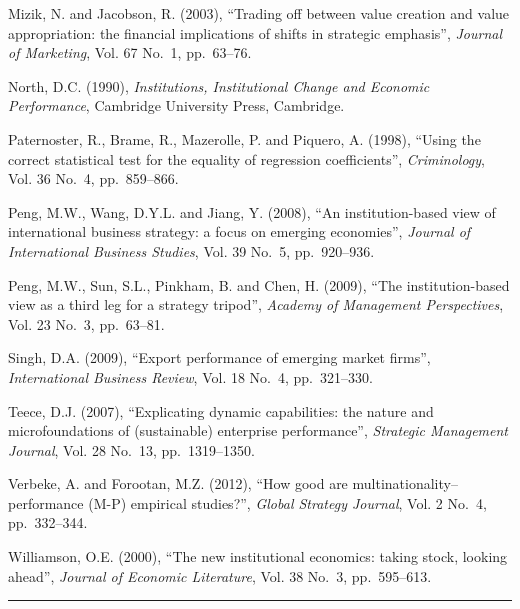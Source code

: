 \documentclass[
  12pt,a4paper]{article}
\begin{document}
Mizik, N. and Jacobson, R. (2003), ``Trading off between value creation
and value appropriation: the financial implications of shifts in
strategic emphasis'', \emph{Journal of Marketing}, Vol. 67 No.~1,
pp.~63--76.

North, D.C. (1990), \emph{Institutions, Institutional Change and
Economic Performance}, Cambridge University Press, Cambridge.

Paternoster, R., Brame, R., Mazerolle, P. and Piquero, A. (1998),
``Using the correct statistical test for the equality of regression
coefficients'', \emph{Criminology}, Vol. 36 No.~4, pp.~859--866.

Peng, M.W., Wang, D.Y.L. and Jiang, Y. (2008), ``An institution-based
view of international business strategy: a focus on emerging
economies'', \emph{Journal of International Business Studies}, Vol. 39
No.~5, pp.~920--936.

Peng, M.W., Sun, S.L., Pinkham, B. and Chen, H. (2009), ``The
institution-based view as a third leg for a strategy tripod'',
\emph{Academy of Management Perspectives}, Vol. 23 No.~3, pp.~63--81.

Singh, D.A. (2009), ``Export performance of emerging market firms'',
\emph{International Business Review}, Vol. 18 No.~4, pp.~321--330.

Teece, D.J. (2007), ``Explicating dynamic capabilities: the nature and
microfoundations of (sustainable) enterprise performance'',
\emph{Strategic Management Journal}, Vol. 28 No.~13, pp.~1319--1350.

Verbeke, A. and Forootan, M.Z. (2012), ``How good are
multinationality--performance (M-P) empirical studies?'', \emph{Global
Strategy Journal}, Vol. 2 No.~4, pp.~332--344.

Williamson, O.E. (2000), ``The new institutional economics: taking
stock, looking ahead'', \emph{Journal of Economic Literature}, Vol. 38
No.~3, pp.~595--613.

\begin{center}\rule{0.5\linewidth}{0.5pt}\end{center}
\end{document}
